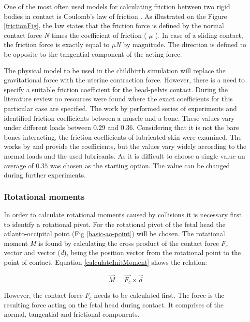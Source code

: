     One of the most often used models for calculating friction between two rigid bodies in contact is Coulomb's law of friction \citep{coulomb00}. As illustrated on the Figure \ref{frictionFig}, the law states that the friction force is defined by the normal contact force \emph{N} times the coefficient of friction ( $\mu$ ). In case of a sliding contact, the friction force is exactly equal to $\mu$\emph{N} by magnitude. The direction is defined to be opposite to the tangential component of the acting force.

    The physical model to be used in the childbirth simulation will replace the gravitational force with the uterine contraction force. However, there is a need to specify a suitable friction coefficient for the head-pelvis contact. During the literature review no resources were found where the exact coefficients for this particular case are specified. The work by \citet{boneFrictionCoefficient} performed series of experiments and identified friction coefficients between a muscle and a bone. These values vary under different loads between $0.29$ and $0.36$. Considering that it is not the bare bones interacting, the friction coefficients of lubricated skin were examined. The works by \citet{skinFrictionInVivo} and \citet{realTimeSkinFriction} provide the coefficients, but the values vary widely according to the normal loads and the used lubricants. As it is difficult to choose a single value an average of $0.35$ was chosen as the starting option. The value can be changed during further experiments.


  \subsubsection{Rotational moments}
    In order to calculate rotational moments caused by collisions it is necessary first to identify a rotational pivot. For the rotational pivot of the fetal head the atlanto-occipital point (Fig \ref{basic-ao-point}) will be chosen. The rotational moment \emph{M} is found by calculating the cross product of the contact force $F_c$ vector and vector (\emph{d}), being the position vector from the rotational point to the point of contact. Equation \ref{calculateInitMoment} shows the relation:

    \begin{equation} \label{calculateInitMoment} \vec{M}=\vec{F_c}\times \vec{d} \end{equation}


    However, the contact force $F_c$ needs to be calculated first. The force is the resulting force acting on the fetal head during contact. It comprises of the normal, tangential and frictional components.

